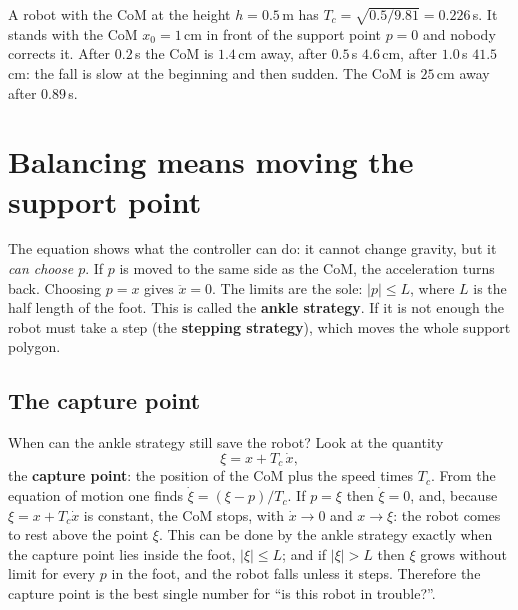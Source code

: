 \begin{example}
A robot with the CoM at the height $h=0.5$\,m has $T_c=\sqrt{0.5/9.81}=0.226$\,s. It stands with the CoM $x_0=1$\,cm in front of the support point $p=0$ and nobody corrects it. After $0.2$\,s the CoM is $1.4$\,cm away, after $0.5$\,s $4.6$\,cm, after $1.0$\,s $41.5$\,cm: the fall is slow at the beginning and then sudden. The CoM is $25$\,cm away after $0.89$\,s.
\end{example}

\begin{center}
\end{center}

\section*{Balancing means moving the support point}
The equation shows what the controller can do: it cannot change gravity, but it \emph{can choose $p$}. If $p$ is moved to the same side as the CoM, the acceleration turns back. Choosing $p=x$ gives $\ddot x=0$. The limits are the sole: $|p|\le L$, where $L$ is the half length of the foot. This is called the \textbf{ankle strategy}. If it is not enough the robot must take a step (the \textbf{stepping strategy}), which moves the whole support polygon.

\subsection*{The capture point}
When can the ankle strategy still save the robot? Look at the quantity
\[
\xi=x+T_c\,\dot x ,
\]
the \textbf{capture point}: the position of the CoM plus the speed times $T_c$. From the equation of motion one finds $\dot\xi=(\xi-p)/T_c$. If $p=\xi$ then $\dot\xi=0$, and, because $\xi=x+T_c\dot x$ is constant, the CoM stops, with $\dot x\to 0$ and $x\to\xi$: the robot comes to rest above the point $\xi$. This can be done by the ankle strategy exactly when the capture point lies inside the foot, $|\xi|\le L$; and if $|\xi|>L$ then $\xi$ grows without limit for every $p$ in the foot, and the robot falls unless it steps. Therefore the capture point is the best single number for ``is this robot in trouble?''.

